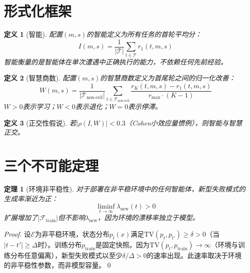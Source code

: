 \documentclass[11pt,a4paper]{article}
\newtheorem{theorem}{定理}
\newtheorem{definition}{定义}
\begin{document}
\section{形式化框架}
\label{sec:framework}

\begin{definition}[智能]
配置$(m, s)$的智能定义为所有任务的首轮平均分：
\begin{equation}
  I(m, s) = \frac{1}{|\mathcal{T}|} \sum_{t \in \mathcal{T}} r_1(t, m, s)
\end{equation}
智能衡量的是智能体在单次遭遇中正确执行的能力，不依赖任何先前经验。
\end{definition}

\begin{definition}[智慧商数]
配置$(m, s)$的智慧商数定义为首尾轮之间的归一化改善：
\begin{equation}
  W(m, s) = \frac{1}{|\mathcal{T}_{\text{non-ceil}}|} \sum_{t \in \mathcal{T}_{\text{non-ceil}}}
    \frac{r_K(t, m, s) - r_1(t, m, s)}{r_{\max} \cdot (K - 1)}
\end{equation}
$W > 0$表示学习；$W < 0$表示退化；$W = 0$表示停滞。
\end{definition}

\begin{definition}[正交性假说]
若$|\rho(I, W)| < 0.3$（Cohen小效应量惯例），则智能与智慧\emph{正交}。
\end{definition}

\section{三个不可能定理}
\label{sec:theorems}

\begin{theorem}[环境非平稳性]
\label{thm:nonstationary}
对于部署在非平稳环境中的任何智能体，新型失败模式的生成率渐近为正：
\begin{equation}
  \liminf_{t \to \infty} \lambda_{\text{new}}(t) > 0
\end{equation}
扩展增加了$|\mathcal{F}_{\text{train}}|$但不影响$\lambda_{\text{new}}$，因为环境的漂移率独立于模型。
\end{theorem}

\begin{proof}
设$\mathcal{E}$为非平稳环境，状态分布$p_t(x)$满足$\text{TV}(p_t, p_{t'}) \geq \delta > 0$（当$|t-t'| \geq \Delta$时）。训练分布$p_{\text{train}}$是固定快照。因为$\text{TV}(p_t, p_{\text{train}}) \to \infty$（环境与训练分布任意偏离），新型失败模式以至少$\delta/\Delta > 0$的速率出现。此速率取决于环境的非平稳性参数，而非模型容量。\qed
\end{proof}
\end{document}
